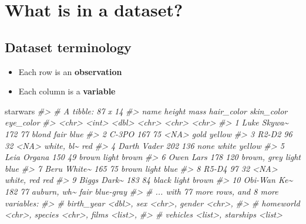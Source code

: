\documentclass[
]{book}
\newenvironment{Shaded}{\begin{snugshade}}{\end{snugshade}}
\newcommand{\CommentTok}[1]{\textcolor[rgb]{0.56,0.35,0.01}{\textit{#1}}}
\newcommand{\NormalTok}[1]{#1}
\providecommand{\tightlist}{%
  \setlength{\itemsep}{0pt}\setlength{\parskip}{0pt}}
\theoremstyle{definition}
\theoremstyle{definition}
\theoremstyle{definition}
\theoremstyle{definition}
\theoremstyle{remark}
\begin{document}
\hypertarget{what-is-in-a-dataset}{%
\chapter{What is in a dataset?}\label{what-is-in-a-dataset}}

\hypertarget{dataset-terminology}{%
\section{Dataset terminology}\label{dataset-terminology}}

\begin{itemize}
\tightlist
\item
  Each row is an \textbf{observation}
\item
  Each column is a \textbf{variable}
\end{itemize}

\begin{Shaded}
\begin{Highlighting}[]
\NormalTok{starwars}
\CommentTok{\#\textgreater{} \# A tibble: 87 x 14}
\CommentTok{\#\textgreater{}    name        height  mass hair\_color  skin\_color eye\_color}
\CommentTok{\#\textgreater{}    \textless{}chr\textgreater{}        \textless{}int\textgreater{} \textless{}dbl\textgreater{} \textless{}chr\textgreater{}       \textless{}chr\textgreater{}      \textless{}chr\textgreater{}    }
\CommentTok{\#\textgreater{}  1 Luke Skywa\textasciitilde{}    172    77 blond       fair       blue     }
\CommentTok{\#\textgreater{}  2 C{-}3PO          167    75 \textless{}NA\textgreater{}        gold       yellow   }
\CommentTok{\#\textgreater{}  3 R2{-}D2           96    32 \textless{}NA\textgreater{}        white, bl\textasciitilde{} red      }
\CommentTok{\#\textgreater{}  4 Darth Vader    202   136 none        white      yellow   }
\CommentTok{\#\textgreater{}  5 Leia Organa    150    49 brown       light      brown    }
\CommentTok{\#\textgreater{}  6 Owen Lars      178   120 brown, grey light      blue     }
\CommentTok{\#\textgreater{}  7 Beru White\textasciitilde{}    165    75 brown       light      blue     }
\CommentTok{\#\textgreater{}  8 R5{-}D4           97    32 \textless{}NA\textgreater{}        white, red red      }
\CommentTok{\#\textgreater{}  9 Biggs Dark\textasciitilde{}    183    84 black       light      brown    }
\CommentTok{\#\textgreater{} 10 Obi{-}Wan Ke\textasciitilde{}    182    77 auburn, wh\textasciitilde{} fair       blue{-}gray}
\CommentTok{\#\textgreater{} \# ... with 77 more rows, and 8 more variables:}
\CommentTok{\#\textgreater{} \#   birth\_year \textless{}dbl\textgreater{}, sex \textless{}chr\textgreater{}, gender \textless{}chr\textgreater{},}
\CommentTok{\#\textgreater{} \#   homeworld \textless{}chr\textgreater{}, species \textless{}chr\textgreater{}, films \textless{}list\textgreater{},}
\CommentTok{\#\textgreater{} \#   vehicles \textless{}list\textgreater{}, starships \textless{}list\textgreater{}}
\end{Highlighting}
\end{Shaded}
\end{document}
